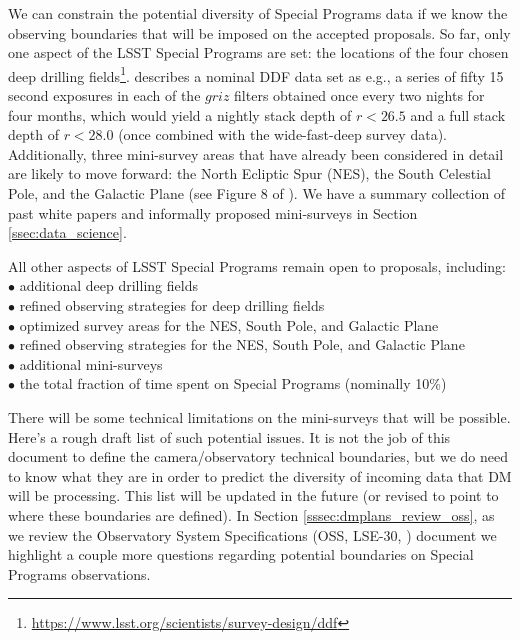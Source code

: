 \documentclass[DM,lsstdraft,toc]{lsstdoc}
\begin{document}
We can constrain the potential diversity of Special Programs data if we know the observing boundaries that will be imposed on the accepted proposals. So far, only one aspect of the LSST Special Programs are set: the locations of the four chosen deep drilling fields\footnote{\url{https://www.lsst.org/scientists/survey-design/ddf}}. \cite{2008arXiv0805.2366I} describes a nominal DDF data set as e.g., a series of fifty 15 second exposures in each of the $griz$ filters obtained once every two nights for four months, which would yield a nightly stack depth of $r<26.5$ and a full stack depth of $r<28.0$ (once combined with the wide-fast-deep survey data). Additionally, three mini-survey areas that have already been considered in detail are likely to move forward: the North Ecliptic Spur (NES), the South Celestial Pole, and the Galactic Plane (see Figure 8 of \cite{2008arXiv0805.2366I}). We have a summary collection of past white papers and informally proposed mini-surveys in Section \ref{ssec:data_science}.

All other aspects of LSST Special Programs remain open to proposals, including: \\
$\bullet$ additional deep drilling fields \\
$\bullet$ refined observing strategies for deep drilling fields \\
$\bullet$ optimized survey areas for the NES, South Pole, and Galactic Plane \\
$\bullet$ refined observing strategies for the NES, South Pole, and Galactic Plane \\
$\bullet$ additional mini-surveys \\
$\bullet$ the total fraction of time spent on Special Programs (nominally 10\%)

There will be some technical limitations on the mini-surveys that will be possible. Here's a rough draft list of such potential issues. It is not the job of this document to define the camera/observatory technical boundaries, but we do need to know what they are in order to predict the diversity of incoming data that DM will be processing. This list will be updated in the future (or revised to point to where these boundaries are defined). In Section \ref{sssec:dmplans_review_oss}, as we review the Observatory System Specifications (OSS, LSE-30, \cite{LSE-30}) document we highlight a couple more questions regarding potential boundaries on Special Programs observations.
\end{document}
